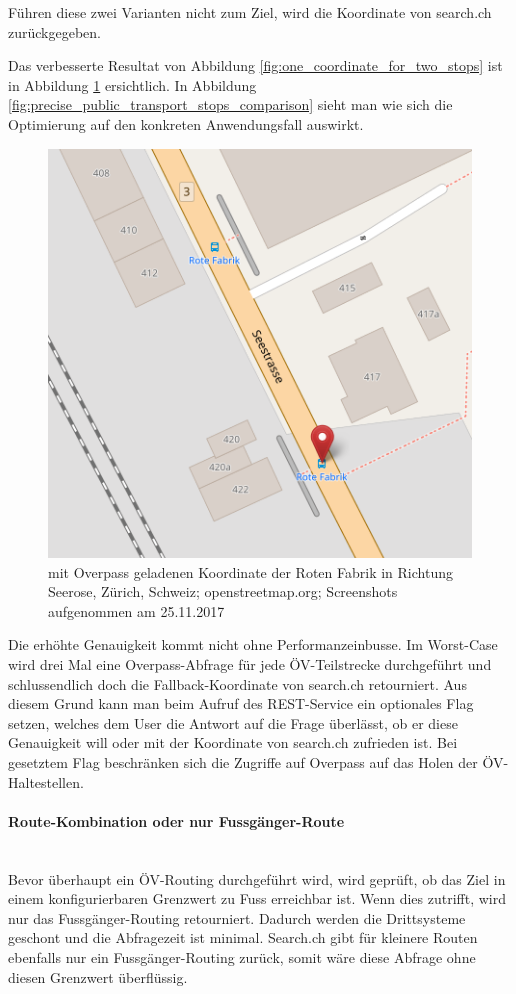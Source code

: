 Führen diese zwei Varianten nicht zum Ziel, wird die Koordinate von search.ch zurückgegeben.

Das verbesserte Resultat von Abbildung \ref{fig:one_coordinate_for_two_stops} ist in Abbildung \ref{fig:one_coordinate_for_two_stops_improved} ersichtlich. In Abbildung \ref{fig:precise_public_transport_stops_comparison} sieht man wie sich die Optimierung auf den konkreten Anwendungsfall auswirkt.

\begin{figure}[ht]
    \centering
    \includegraphics[width=0.5\linewidth]{projectdoc/img/one_coordinate_for_two_stops_improved}
    \caption[mit Overpass geladenen Koordinate]{mit Overpass geladenen Koordinate der Roten Fabrik in Richtung Seerose, Zürich, Schweiz; openstreetmap.org; Screenshots aufgenommen am 25.11.2017}
    \label{fig:one_coordinate_for_two_stops_improved}
\end{figure}


Die erhöhte Genauigkeit kommt nicht ohne Performanzeinbusse. Im Worst-Case wird drei Mal eine Overpass-Abfrage \cite{wiki:overpass} für jede ÖV-Teilstrecke durchgeführt und schlussendlich doch die Fallback-Koordinate von search.ch \cite{search_ch_route_api} retourniert. Aus diesem Grund kann man beim Aufruf des \ac{REST}-Service ein optionales Flag setzen, welches dem User die Antwort auf die Frage überlässt, ob er diese Genauigkeit will oder mit der Koordinate von search.ch \cite{search_ch_route_api} zufrieden ist. Bei gesetztem Flag beschränken sich die Zugriffe auf Overpass \cite{wiki:overpass} auf das Holen der ÖV-Haltestellen.

\paragraph{Route-Kombination oder nur Fussgänger-Route}\label{impl:Route-Kombination oder nur Fussgänger-Route}~\\
Bevor überhaupt ein ÖV-Routing durchgeführt wird, wird geprüft, ob das Ziel in einem konfigurierbaren Grenzwert zu Fuss erreichbar ist. Wenn dies zutrifft, wird nur das Fussgänger-Routing retourniert. Dadurch werden die Drittsysteme geschont und die Abfragezeit ist minimal. Search.ch \cite{search_ch_route_api} gibt für kleinere Routen ebenfalls nur ein Fussgänger-Routing zurück, somit wäre diese Abfrage ohne diesen Grenzwert überflüssig.

